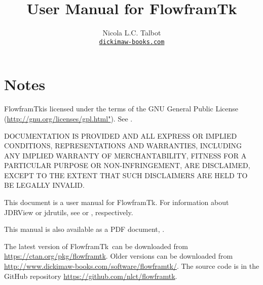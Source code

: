 
\usepackage{fontspec}
\setmainfont{Linux Libertine O}
\usepackage{verbatim}
\usepackage{longtable}
\usepackage{booktabs}
\usepackage
 [
    novref,
 ]{texjavahelp}

\hypersetup{colorlinks,linkcolor=blue}

\newcommand{\appname}{FlowframTk}

\title{User Manual for \appname}
\author{Nicola L.C. Talbot\\\href{https://www.dickimaw-books.com/}{\nolinkurl{dickimaw-books.com}}}


\GlsXtrLoadResources[src={flowframtk,\langbibsrcs},
 \TeXJavaHelpSymbolResourceOptions
]

\GlsXtrLoadResources[src={flowframtk,\langbibsrcs},
 \TeXJavaHelpGlsResourceOptions
]


\maketitle
\frontmatter
\tableofcontents
\listoffigures

\chapter{Notes}

\appname is licensed under the terms of the GNU General Public License
(\url{http://gnu.org/licenses/gpl.html"}).
See .

DOCUMENTATION IS PROVIDED  AND ALL EXPRESS OR IMPLIED
CONDITIONS, REPRESENTATIONS AND WARRANTIES, INCLUDING ANY
IMPLIED WARRANTY OF MERCHANTABILITY, FITNESS FOR A PARTICULAR
PURPOSE OR NON-INFRINGEMENT, ARE DISCLAIMED, EXCEPT TO THE EXTENT THAT
SUCH DISCLAIMERS ARE HELD TO BE LEGALLY INVALID.

This document is a user manual for \appname. For information about
JDRView or jdrutils, see  or
, respectively.

\IfTeXParserLib
  {%
    This manual is also available as a PDF document, . 
  }
  {}

The latest version of \appname\ can be downloaded from
\url{https://ctan.org/pkg/flowframtk}.
Older versions can be downloaded from
\url{http://www.dickimaw-books.com/software/flowframtk/}.
The source code is in the GitHub repository
\url{https://github.com/nlct/flowframtk}.

